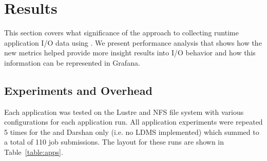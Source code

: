 \section{Results}
\label{sec:results}

This section covers what significance of the approach to collecting
runtime application I/O data using \Darshan. We present performance
analysis that shows how the new metrics helped provide more insight
results into I/O behavior and how this information can be represented
in Grafana.

\subsection{Experiments and Overhead}
Each application was tested on the Lustre and NFS file system with various configurations for each application run. All application experiments were repeated 5 times for the \connector{} and Darshan only (i.e. no LDMS implemented) which summed to a total of 110 job submissions. The layout for these runs are shown in Table~\ref{table:apps}.  

